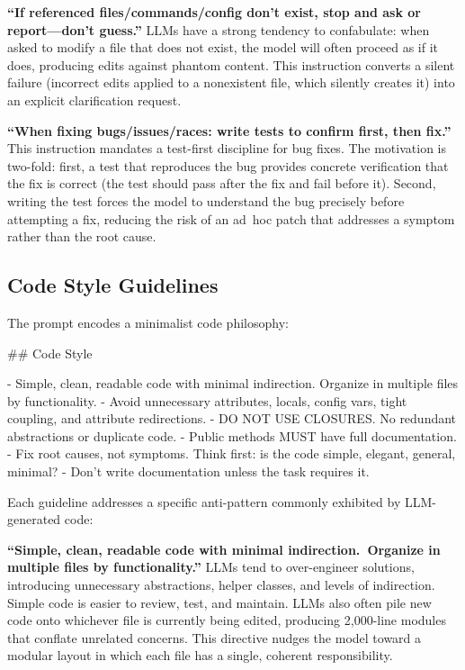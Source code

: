 \documentclass{article}
\begin{document}
\textbf{``If referenced files/commands/config don't exist, stop and ask or report---don't guess.''}  LLMs have a strong tendency to confabulate: when asked to modify a file that does not exist, the model will often proceed as if it does, producing edits against phantom content.  This instruction converts a silent failure (incorrect edits applied to a nonexistent file, which silently creates it) into an explicit clarification request.

\textbf{``When fixing bugs/issues/races: write tests to confirm first, then fix.''}  This instruction mandates a test-first discipline for bug fixes.  The motivation is two-fold: first, a test that reproduces the bug provides concrete verification that the fix is correct (the test should pass after the fix and fail before it).  Second, writing the test forces the model to understand the bug precisely before attempting a fix, reducing the risk of an ad~hoc patch that addresses a symptom rather than the root cause.

\subsection{Code Style Guidelines}

The prompt encodes a minimalist code philosophy:

\begin{prompt}
## Code Style

- Simple, clean, readable code with minimal indirection. Organize in multiple files by functionality.
- Avoid unnecessary attributes, locals, config vars, tight coupling, and attribute redirections.
- DO NOT USE CLOSURES. No redundant abstractions or duplicate code.
- Public methods MUST have full documentation.
- Fix root causes, not symptoms. Think first: is the code simple, elegant, general, minimal?
- Don't write documentation unless the task requires it.
\end{prompt}

\noindent Each guideline addresses a specific anti-pattern commonly
exhibited by LLM-generated code:

\textbf{``Simple, clean, readable code with minimal indirection.\ Organize in multiple files by functionality.''}  LLMs tend to over-engineer solutions, introducing unnecessary abstractions, helper classes, and levels of indirection.  Simple code is easier to review, test, and maintain.  LLMs also often pile new code onto whichever file is currently being edited, producing 2,000-line modules that conflate unrelated concerns.  This directive nudges the model toward a modular layout in which each file has a single, coherent responsibility.
\end{document}
